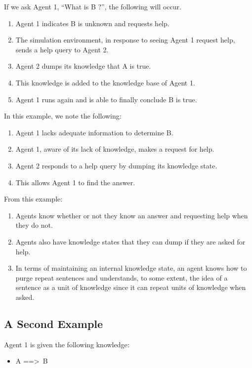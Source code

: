 \documentclass{article}
\begin{document}
If we ask Agent 1, ``What is B ?'', the following will occur.

\begin{enumerate}
	\item Agent 1 indicates B is unknown and requests help.
	\item The simulation environment, in response to seeing Agent 1 request help, sends a help query to Agent 2.
	\item Agent 2 dumps its knowledge that A is true.
	\item This knowledge is added to the knowledge base of Agent 1.
	\item Agent 1 runs again and is able to finally conclude B is true.
\end{enumerate}

In this example, we note the following:

\begin{enumerate}
	\item Agent 1 lacks adequate information to determine B. 
	\item Agent 1, aware of its lack of knowledge, makes a request for help.
	\item Agent 2 responds to a help query by dumping its knowledge state.
	\item This allows Agent 1 to find the answer.
\end{enumerate}

From this example:

\begin{enumerate}
	\item Agents know whether or not they know an answer and requesting help when they do not.
	\item Agents also have knowledge states that they can dump if they are asked for help.
	\item In terms of maintaining an internal knowledge state, an agent knows how to purge repeat sentences and understands, to some extent, the idea of a sentence as a unit of knowledge since it can repeat units of knowledge when asked.
\end{enumerate}

\subsection{A Second Example}
\label{example_2}

Agent 1 is given the following knowledge:

\begin{itemize}
	\item A ==\textgreater \, B
\end{itemize}
\end{document}
